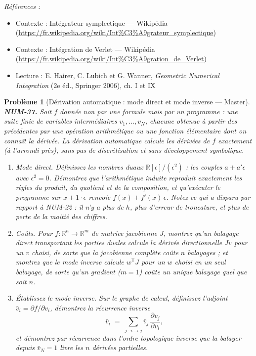 \documentclass[11pt]{article}
\newtheorem{problem}{Problème}
\newenvironment{refs}{\par\small\noindent\emph{Références :}\begin{itemize}\setlength\itemsep{0pt}}{\end{itemize}\normalsize}
\begin{document}
\begin{refs}
\item Contexte : Intégrateur symplectique --- Wikipédia (\url{https://fr.wikipedia.org/wiki/Int%C3%A9grateur_symplectique})
\item Contexte : Intégration de Verlet --- Wikipédia (\url{https://fr.wikipedia.org/wiki/Int%C3%A9gration_de_Verlet})
\item Lecture : E. Hairer, C. Lubich et G. Wanner, \textit{Geometric Numerical Integration} (2e éd., Springer 2006), ch. I et IX
\end{refs}

\bigskip

\begin{problem}[{Dérivation automatique : mode direct et mode inverse --- Master}]
\textbf{NUM-37.} Soit $f$ donnée non par une formule mais par un programme : une suite finie de variables intermédiaires $v_1, \ldots, v_N$, chacune obtenue à partir des précédentes par une opération arithmétique ou une fonction élémentaire dont on connaît la dérivée. La dérivation automatique calcule les dérivées de $f$ exactement (à l'arrondi près), sans pas de discrétisation et sans développement symbolique.
\begin{enumerate}
\item[(a)] Mode direct. Définissez les nombres duaux $\mathbb{R}[\epsilon]/(\epsilon^2)$ : les couples $a + a'\epsilon$ avec $\epsilon^2 = 0$. Démontrez que l'arithmétique induite reproduit exactement les règles du produit, du quotient et de la composition, et qu'exécuter le programme sur $x + 1\cdot\epsilon$ renvoie $f(x) + f'(x)\,\epsilon$. Notez ce qui a disparu par rapport à NUM-22 : il n'y a plus de $h$, plus d'erreur de troncature, et plus de perte de la moitié des chiffres.
\item[(b)] Coûts. Pour $f : \mathbb{R}^n \to \mathbb{R}^m$ de matrice jacobienne $J$, montrez qu'un balayage direct transportant les parties duales calcule la dérivée directionnelle $Jv$ pour un $v$ choisi, de sorte que la jacobienne complète coûte $n$ balayages ; et montrez que le mode inverse calcule $w^{\mathsf T}J$ pour un $w$ choisi en un seul balayage, de sorte qu'un gradient ($m = 1$) coûte un unique balayage quel que soit $n$.
\item[(c)] Établissez le mode inverse. Sur le graphe de calcul, définissez l'adjoint $\bar{v}_i = \partial f / \partial v_i$, démontrez la récurrence inverse
\[ \bar{v}_i \;=\; \sum_{j\,:\, i \to j} \bar{v}_j \,\frac{\partial v_j}{\partial v_i}, \]
et démontrez par récurrence dans l'ordre topologique inverse que la balayer depuis $\bar{v}_N = 1$ livre les $n$ dérivées partielles.

\end{enumerate}
\end{problem}
\end{document}
